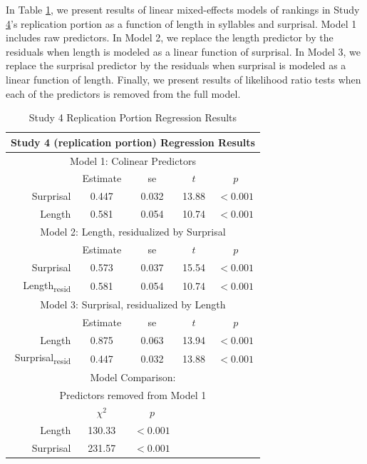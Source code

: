\begin{appendices}
In Table \ref{table:4rep}, we present results of linear mixed-effects models of rankings in Study \hyperref[sec:study4]{4}'s replication portion as a function of length in syllables and surprisal.
Model 1 includes raw predictors.
In Model 2, we replace the length predictor by the residuals when length is modeled as a linear function of surprisal.
In Model 3, we replace the surprisal predictor by the residuals when surprisal is modeled as a linear function of length.
Finally, we present results of likelihood ratio tests when each of the predictors is removed from the full model.

\begin{table}[h]
\center
\footnotesize
\begin{tabular}{r|cccc}
\hline
\hline
\multicolumn{5}{c}{\textbf{Study 4 (replication portion) Regression Results}} \\
\hline
\hline
\multicolumn{5}{c}{Model 1: Colinear Predictors} \\
& Estimate & se & $t$ & $p$ \\
\hline
Surprisal & 0.447 & 0.032 & 13.88 & $<0.001$ \\
Length & 0.581 & 0.054 & 10.74 & $<0.001$ \\
\hline
\hline
\multicolumn{5}{c}{Model 2: Length, residualized by Surprisal} \\
& Estimate & se & $t$ & $p$ \\
\hline
Surprisal & 0.573 & 0.037 & 15.54 & $<0.001$ \\
Length\textsubscript{resid} & 0.581 & 0.054 & 10.74 & $<0.001$ \\
\hline
\hline
\multicolumn{5}{c}{Model 3: Surprisal, residualized by Length} \\
& Estimate & se & $t$ & $p$ \\
\hline
Length & 0.875 & 0.063 & 13.94 & $<0.001$ \\
Surprisal\textsubscript{resid} & 0.447 & 0.032 & 13.88 & $<0.001$ \\
\hline
\hline
\multicolumn{5}{c}{Model Comparison:} \\
\multicolumn{5}{c}{Predictors removed from Model 1} \\
& $\chi^2$ & $p$ \\
\hline
Length & 130.33 & $<0.001$ \\
Surprisal & 231.57 & $<0.001$ \\
\hline
\hline
\end{tabular}

\caption{Study 4 Replication Portion Regression Results}
\label{table:4rep}
\end{table}




\end{appendices}
